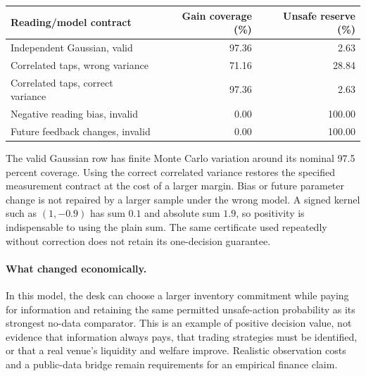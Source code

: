 \documentclass[12pt]{article}
\theoremstyle{definition}
\theoremstyle{remark}
\begin{document}
\begin{center}\footnotesize\begin{tabular}{p{}rr}
\toprule
Reading/model contract & Gain coverage (\%) & Unsafe reserve (\%)\\
\midrule
Independent Gaussian, valid & 97.36 & 2.63\\
Correlated taps, wrong variance & 71.16 & 28.84\\
Correlated taps, correct variance & 97.36 & 2.63\\
Negative reading bias, invalid & 0.00 & 100.00\\
Future feedback changes, invalid & 0.00 & 100.00\\
\bottomrule\end{tabular}\end{center}
The valid Gaussian row has finite Monte Carlo variation around its nominal
97.5 percent coverage. Using the correct correlated variance restores the
specified measurement contract at the cost of a larger margin. Bias or
future parameter change is not repaired by a larger sample under the wrong
model. A signed kernel such as $(1,-0.9)$ has sum $0.1$ and absolute sum
$1.9$, so positivity is indispensable to using the plain sum. The same
certificate used repeatedly without correction does not retain its
one-decision guarantee.

\paragraph{What changed economically.}
In this model, the desk can choose a larger inventory commitment while
paying for information and retaining the same permitted unsafe-action
probability as its strongest no-data comparator. This is an example of
positive decision value, not evidence that information always pays, that
trading strategies must be identified, or that a real venue's liquidity and
welfare improve. Realistic observation costs and a public-data bridge remain
requirements for an empirical finance claim.

\end{document}
